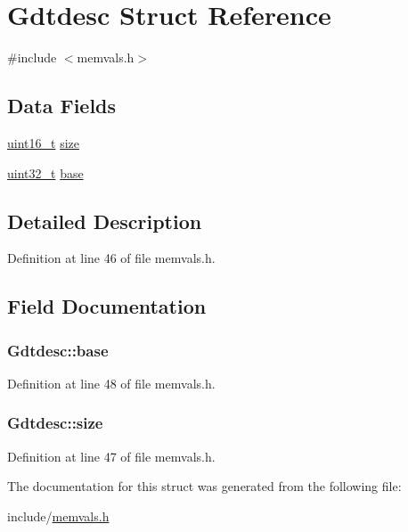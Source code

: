 \hypertarget{structGdtdesc}{\section{\-Gdtdesc \-Struct \-Reference}
\label{structGdtdesc}
}


{\ttfamily \#include $<$memvals.\-h$>$}

\subsection*{\-Data \-Fields}
\begin{DoxyCompactItemize}
\item 
\hyperlink{types_8h_a273cf69d639a59973b6019625df33e30}{uint16\-\_\-t} \hyperlink{structGdtdesc_ac0d1be82cabe1fa03e00554ff3f6eaf0}{size}
\item 
\hyperlink{types_8h_a435d1572bf3f880d55459d9805097f62}{uint32\-\_\-t} \hyperlink{structGdtdesc_a00e9d2c71072e7ea0c92f2868b9822aa}{base}
\end{DoxyCompactItemize}


\subsection{\-Detailed \-Description}


\-Definition at line 46 of file memvals.\-h.



\subsection{\-Field \-Documentation}
\hypertarget{structGdtdesc_a00e9d2c71072e7ea0c92f2868b9822aa}{
\subsubsection[{base}]{ {\bf \-Gdtdesc\-::base}}}\label{structGdtdesc_a00e9d2c71072e7ea0c92f2868b9822aa}


\-Definition at line 48 of file memvals.\-h.

\hypertarget{structGdtdesc_ac0d1be82cabe1fa03e00554ff3f6eaf0}{
\subsubsection[{size}]{ {\bf \-Gdtdesc\-::size}}}\label{structGdtdesc_ac0d1be82cabe1fa03e00554ff3f6eaf0}


\-Definition at line 47 of file memvals.\-h.



\-The documentation for this struct was generated from the following file\-:\begin{DoxyCompactItemize}
\item 
include/\hyperlink{memvals_8h}{memvals.\-h}\end{DoxyCompactItemize}
